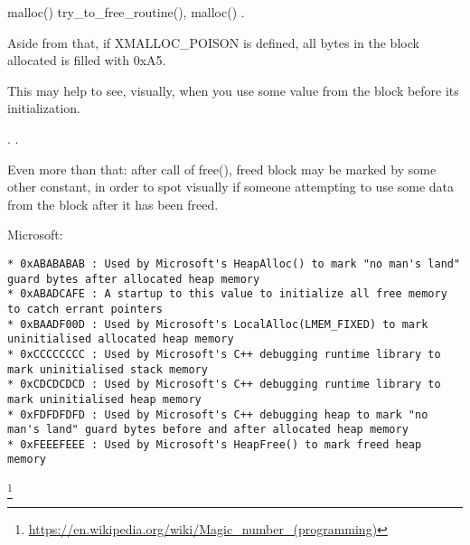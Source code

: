  malloc() 
try\_to\_free\_routine(),  malloc() .

{Aside from that, if} XMALLOC\_POISON
{ is defined, all bytes in the block allocated is filled with} 0xA5.

{This may help to see, visually, when you use some value from the block before its initialization}.

  .
.

{Even more than that: after call of free(), freed block may be marked by some other constant, in order
to spot visually if someone attempting to use some data from the block after it has been freed}.

 Microsoft:

\begin{lstlisting}
* 0xABABABAB : Used by Microsoft's HeapAlloc() to mark "no man's land" guard bytes after allocated heap memory
* 0xABADCAFE : A startup to this value to initialize all free memory to catch errant pointers
* 0xBAADF00D : Used by Microsoft's LocalAlloc(LMEM_FIXED) to mark uninitialised allocated heap memory
* 0xCCCCCCCC : Used by Microsoft's C++ debugging runtime library to mark uninitialised stack memory
* 0xCDCDCDCD : Used by Microsoft's C++ debugging runtime library to mark uninitialised heap memory
* 0xFDFDFDFD : Used by Microsoft's C++ debugging heap to mark "no man's land" guard bytes before and after allocated heap memory
* 0xFEEEFEEE : Used by Microsoft's HeapFree() to mark freed heap memory
\end{lstlisting}
\footnote{\url{https://en.wikipedia.org/wiki/Magic_number_(programming)}}

